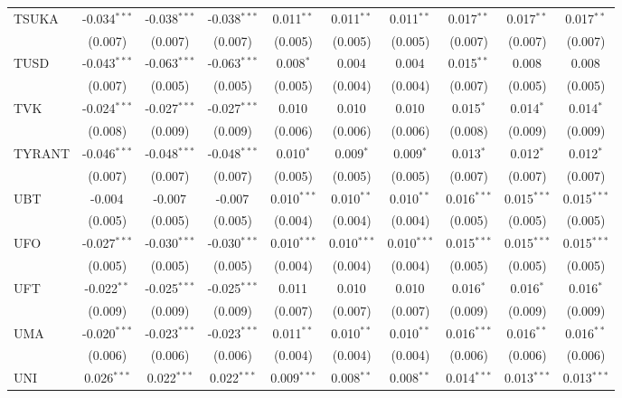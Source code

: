 \begin{table}[!htbp]
\begin{tabular}{@{\extracolsep{5pt}}lccccccccc}
 TSUKA & -0.034$^{***}$ & -0.038$^{***}$ & -0.038$^{***}$ & 0.011$^{**}$ & 0.011$^{**}$ & 0.011$^{**}$ & 0.017$^{**}$ & 0.017$^{**}$ & 0.017$^{**}$ \\
  & (0.007) & (0.007) & (0.007) & (0.005) & (0.005) & (0.005) & (0.007) & (0.007) & (0.007) \\
 TUSD & -0.043$^{***}$ & -0.063$^{***}$ & -0.063$^{***}$ & 0.008$^{*}$ & 0.004$^{}$ & 0.004$^{}$ & 0.015$^{**}$ & 0.008$^{}$ & 0.008$^{}$ \\
  & (0.007) & (0.005) & (0.005) & (0.005) & (0.004) & (0.004) & (0.007) & (0.005) & (0.005) \\
 TVK & -0.024$^{***}$ & -0.027$^{***}$ & -0.027$^{***}$ & 0.010$^{}$ & 0.010$^{}$ & 0.010$^{}$ & 0.015$^{*}$ & 0.014$^{*}$ & 0.014$^{*}$ \\
  & (0.008) & (0.009) & (0.009) & (0.006) & (0.006) & (0.006) & (0.008) & (0.009) & (0.009) \\
 TYRANT & -0.046$^{***}$ & -0.048$^{***}$ & -0.048$^{***}$ & 0.010$^{*}$ & 0.009$^{*}$ & 0.009$^{*}$ & 0.013$^{*}$ & 0.012$^{*}$ & 0.012$^{*}$ \\
  & (0.007) & (0.007) & (0.007) & (0.005) & (0.005) & (0.005) & (0.007) & (0.007) & (0.007) \\
 UBT & -0.004$^{}$ & -0.007$^{}$ & -0.007$^{}$ & 0.010$^{***}$ & 0.010$^{**}$ & 0.010$^{**}$ & 0.016$^{***}$ & 0.015$^{***}$ & 0.015$^{***}$ \\
  & (0.005) & (0.005) & (0.005) & (0.004) & (0.004) & (0.004) & (0.005) & (0.005) & (0.005) \\
 UFO & -0.027$^{***}$ & -0.030$^{***}$ & -0.030$^{***}$ & 0.010$^{***}$ & 0.010$^{***}$ & 0.010$^{***}$ & 0.015$^{***}$ & 0.015$^{***}$ & 0.015$^{***}$ \\
  & (0.005) & (0.005) & (0.005) & (0.004) & (0.004) & (0.004) & (0.005) & (0.005) & (0.005) \\
 UFT & -0.022$^{**}$ & -0.025$^{***}$ & -0.025$^{***}$ & 0.011$^{}$ & 0.010$^{}$ & 0.010$^{}$ & 0.016$^{*}$ & 0.016$^{*}$ & 0.016$^{*}$ \\
  & (0.009) & (0.009) & (0.009) & (0.007) & (0.007) & (0.007) & (0.009) & (0.009) & (0.009) \\
 UMA & -0.020$^{***}$ & -0.023$^{***}$ & -0.023$^{***}$ & 0.011$^{**}$ & 0.010$^{**}$ & 0.010$^{**}$ & 0.016$^{***}$ & 0.016$^{**}$ & 0.016$^{**}$ \\
  & (0.006) & (0.006) & (0.006) & (0.004) & (0.004) & (0.004) & (0.006) & (0.006) & (0.006) \\
 UNI & 0.026$^{***}$ & 0.022$^{***}$ & 0.022$^{***}$ & 0.009$^{***}$ & 0.008$^{**}$ & 0.008$^{**}$ & 0.014$^{***}$ & 0.013$^{***}$ & 0.013$^{***}$ \\

\end{tabular}
\end{table}
